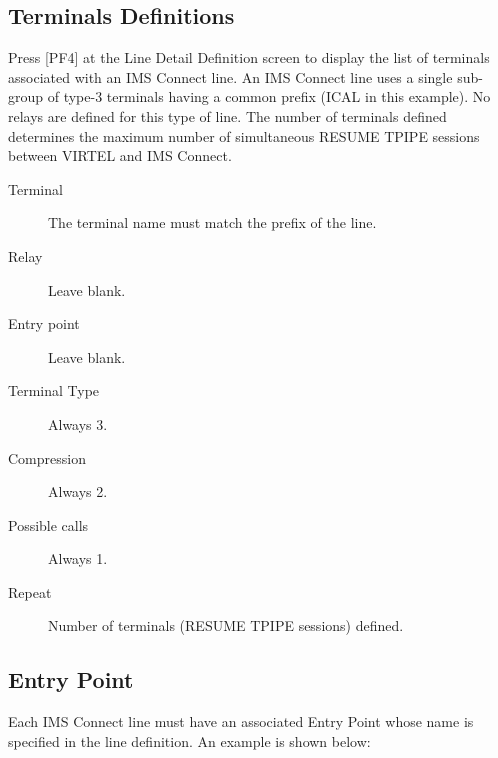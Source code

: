 \documentclass[letterpaper,10pt,english]{sphinxmanual}
\begin{document}
\ignorespaces 

\subsection{Terminals Definitions}
\label{\detokenize{connectivity_guide:terminals-definitions}}\label{\detokenize{connectivity_guide:index-23}}
Press {[}PF4{]} at the Line Detail Definition screen to display the list of terminals associated with an IMS Connect line. An IMS Connect line uses a single sub-group of type-3 terminals having a common prefix (ICAL in this example). No relays are defined for this type of line. The number of terminals defined determines the maximum number of simultaneous RESUME TPIPE sessions between VIRTEL and IMS Connect.

\begin{description}
\item[{Terminal}] \leavevmode
The terminal name must match the prefix of the line.

\item[{Relay}] \leavevmode
Leave blank.

\item[{Entry point}] \leavevmode
Leave blank.

\item[{Terminal Type}] \leavevmode
Always 3.

\item[{Compression}] \leavevmode
Always 2.

\item[{Possible calls}] \leavevmode
Always 1.

\item[{Repeat}] \leavevmode
Number of terminals (RESUME TPIPE sessions) defined.

\end{description}

\ignorespaces 

\subsection{Entry Point}
\label{\detokenize{connectivity_guide:entry-point}}\label{\detokenize{connectivity_guide:index-24}}
Each IMS Connect line must have an associated Entry Point whose name is specified in the line definition. An example is shown below:
\end{document}
